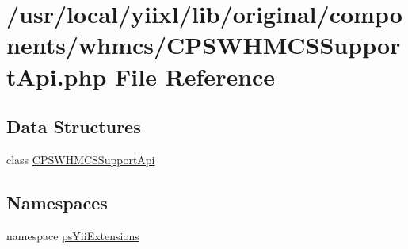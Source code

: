 \hypertarget{CPSWHMCSSupportApi_8php}{
\section{/usr/local/yiixl/lib/original/components/whmcs/CPSWHMCSSupportApi.php File Reference}
\label{CPSWHMCSSupportApi_8php}
}
\subsection*{Data Structures}
\begin{DoxyCompactItemize}
\item 
class \hyperlink{classCPSWHMCSSupportApi}{CPSWHMCSSupportApi}
\end{DoxyCompactItemize}
\subsection*{Namespaces}
\begin{DoxyCompactItemize}
\item 
namespace \hyperlink{namespacepsYiiExtensions}{psYiiExtensions}
\end{DoxyCompactItemize}
